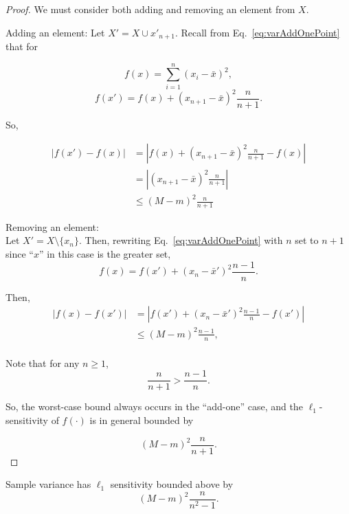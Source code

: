 \documentclass[11pt]{scrartcl} %
\begin{document}
 \begin{proof}
 	We must consider both adding and removing an element from $X$. \newline

 	Adding an element: \newline
 	Let $X' = X \cup x'_{n+1}$. Recall from Eq.~\ref{eq:varAddOnePoint} that for

	$$ f(x) = \sum_{i=1}^n (x_i - \bar{x})^2, $$
	$$ f(x') = f(x) + (x_{n+1} - \bar{x})^2 \frac{n}{n+1}.$$

	So,

	\begin{align}
	\label{eq:L1add}
	\left\vert f(x') - f(x) \right\vert &= \left\vert f(x) + (x_{n+1} - \bar{x})^2 \frac{n}{n+1} - f(x) \right\vert \nonumber\\
		&= \left\vert (x_{n+1} - \bar{x})^2 \frac{n}{n+1} \right\vert \nonumber \\
		&\le \left( M-m \right)^2 \frac{n}{n+1} 
	\end{align}

	Removing an element: \\
	Let $X' = X \setminus \{x_n\}$. Then, rewriting Eq.~\ref{eq:varAddOnePoint} with $n$ set to $n+1$ since ``$x$'' in this case is the greater set,
	$$ f(x) = f(x') + (x_n - \bar{x}')^2 \frac{n-1}{n}.$$

	Then,
	\begin{align}
	\label{eq:L1sub}
	\left\vert f(x) - f(x') \right\vert &= \left\vert f(x') + (x_n - \bar{x}')^2 \frac{n-1}{n} - f(x') \right\vert \nonumber\\
		&\le (M-m)^2 \frac{n-1}{n},\\
	\end{align}

	Note that for any $n \ge 1$,
	\begin{equation}
	\label{ineq}
	 \frac{n}{n + 1} > \frac{n-1}{n}.
	\end{equation}

	So, the worst-case bound always occurs in the ``add-one'' case, and the $\ell_1$-sensitivity of $f(\cdot)$ is in general bounded by

\begin{equation}
\label{eq:fBoundaddsub}
\left( M-m \right)^2 \frac{n}{n + 1}.
\end{equation}

 \end{proof}

 \begin{corollary}
 \label{cor:l1addsub}
	Sample variance has $\ell_1$ sensitivity bounded above by
	$$\left( M-m \right)^2 \frac{n}{n^2 - 1}. $$
 \end{corollary}
 
\end{document}

